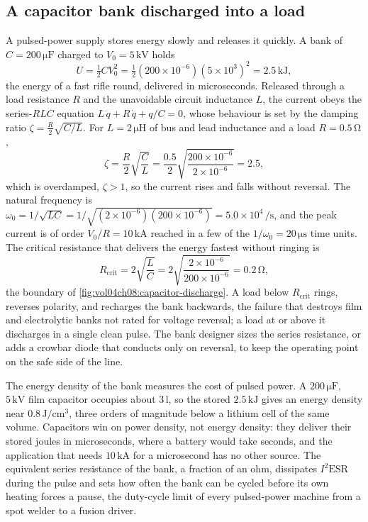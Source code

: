 \subsection{A capacitor bank discharged into a load}

A pulsed-power supply stores energy slowly and releases it quickly. A
bank of $C = 200\,\si{\micro\farad}$ charged to $V_0 = 5\,\si{\kilo
\volt}$ holds
\[
U = \tfrac12 C V_0^{2} = \tfrac12(200\times 10^{-6})(5\times 10^{3})^{2}
= 2.5\,\si{\kilo\joule},
\]
the energy of a fast rifle round, delivered in microseconds. Released
through a load resistance $R$ and the unavoidable circuit inductance
$L$, the current obeys the series-$RLC$ equation $L\,\ddot q + R\,\dot q
+ q/C = 0$, whose behaviour is set by the damping ratio $\zeta =
\tfrac{R}{2}\sqrt{C/L}$. For $L = 2\,\si{\micro\henry}$ of bus and lead
inductance and a load $R = 0.5\,\si{\ohm}$,
\[
\zeta = \frac{R}{2}\sqrt{\frac{C}{L}} = \frac{0.5}{2}\sqrt{\frac{200
\times 10^{-6}}{2\times 10^{-6}}} = 2.5,
\]
which is overdamped, $\zeta > 1$, so the current rises and falls without
reversal. The natural frequency is $\omega_0 = 1/\sqrt{LC} = 1/\sqrt{(2
\times 10^{-6})(200\times 10^{-6})} = 5.0\times 10^4\,\si{\per\second}$,
and the peak current is of order $V_0/R = 10\,\si{\kilo\ampere}$ reached
in a few of the $1/\omega_0 = 20\,\si{\micro\second}$ time units. The
critical resistance that delivers the energy fastest without ringing is
\[
R_{\text{crit}} = 2\sqrt{\frac{L}{C}} = 2\sqrt{\frac{2\times 10^{-6}}{
200\times 10^{-6}}} = 0.2\,\si{\ohm},
\]
the boundary of \cref{fig:vol04ch08:capacitor-discharge}. A load below
$R_{\text{crit}}$ rings, reverses polarity, and recharges the bank
backwards, the failure that destroys film and electrolytic banks not
rated for voltage reversal; a load at or above it discharges in a single
clean pulse. The bank designer sizes the series resistance, or adds a
crowbar diode that conducts only on reversal, to keep the operating
point on the safe side of the line.



The energy density of the bank measures the cost of pulsed power. A
$200\,\si{\micro\farad}$, $5\,\si{\kilo\volt}$ film capacitor occupies
about $3\,\si{\litre}$, so the stored $2.5\,\si{\kilo\joule}$ gives an
energy density near $0.8\,\si{\joule\per\centi\meter\cubed}$, three orders
of magnitude below a lithium cell of the same volume. Capacitors win on
power density, not energy density: they deliver their stored joules in
microseconds, where a battery would take seconds, and the application
that needs $10\,\si{\kilo\ampere}$ for a microsecond has no other source.
The equivalent series resistance of the bank, a fraction of an ohm,
dissipates $I^{2}\text{ESR}$ during the pulse and sets how often the
bank can be cycled before its own heating forces a pause, the duty-cycle
limit of every pulsed-power machine from a spot welder to a fusion
driver.

